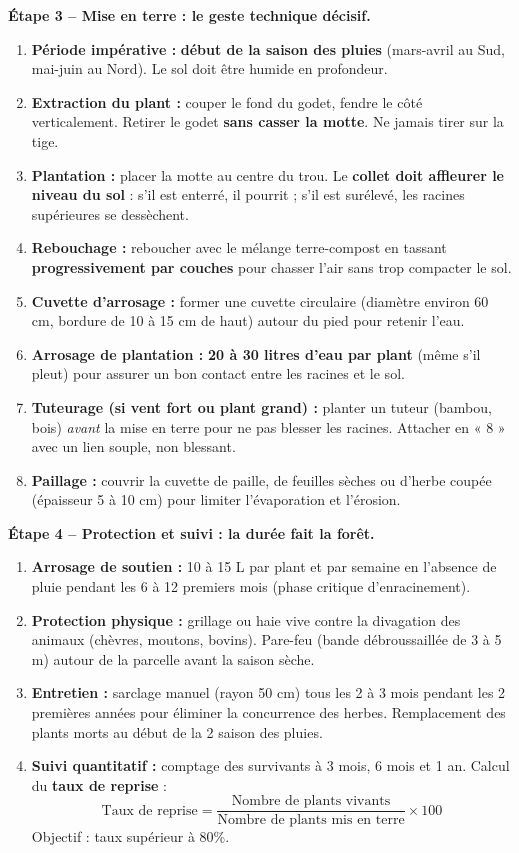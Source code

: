 \documentclass[11pt]{article}
\begin{document}
\begin{methode}
\textbf{Étape 3 -- Mise en terre : le geste technique décisif.}
\begin{enumerate}
    \item \textbf{Période impérative :} \textbf{début de la saison des pluies} (mars-avril au Sud, mai-juin au Nord). Le sol doit être humide en profondeur.
    \item \textbf{Extraction du plant :} couper le fond du godet, fendre le côté verticalement. Retirer le godet \textbf{sans casser la motte}. Ne jamais tirer sur la tige.
    \item \textbf{Plantation :} placer la motte au centre du trou. Le \textbf{collet doit affleurer le niveau du sol} : s'il est enterré, il pourrit ; s'il est surélevé, les racines supérieures se dessèchent.
    \item \textbf{Rebouchage :} reboucher avec le mélange terre-compost en tassant \textbf{progressivement par couches} pour chasser l'air sans trop compacter le sol.
    \item \textbf{Cuvette d'arrosage :} former une cuvette circulaire (diamètre environ 60 cm, bordure de 10 à 15 cm de haut) autour du pied pour retenir l'eau.
    \item \textbf{Arrosage de plantation :} \textbf{20 à 30 litres d'eau par plant} (même s'il pleut) pour assurer un bon contact entre les racines et le sol.
    \item \textbf{Tuteurage (si vent fort ou plant grand) :} planter un tuteur (bambou, bois) \textit{avant} la mise en terre pour ne pas blesser les racines. Attacher en « 8 » avec un lien souple, non blessant.
    \item \textbf{Paillage :} couvrir la cuvette de paille, de feuilles sèches ou d'herbe coupée (épaisseur 5 à 10 cm) pour limiter l'évaporation et l'érosion.
\end{enumerate}

\textbf{Étape 4 -- Protection et suivi : la durée fait la forêt.}
\begin{enumerate}
    \item \textbf{Arrosage de soutien :} 10 à 15 L par plant et par semaine en l'absence de pluie pendant les 6 à 12 premiers mois (phase critique d'enracinement).
    \item \textbf{Protection physique :} grillage ou haie vive contre la divagation des animaux (chèvres, moutons, bovins). Pare-feu (bande débroussaillée de 3 à 5 m) autour de la parcelle avant la saison sèche.
    \item \textbf{Entretien :} sarclage manuel (rayon 50 cm) tous les 2 à 3 mois pendant les 2 premières années pour éliminer la concurrence des herbes. Remplacement des plants morts au début de la 2 saison des pluies.
    \item \textbf{Suivi quantitatif :} comptage des survivants à 3 mois, 6 mois et 1 an. Calcul du \textbf{taux de reprise} :
    \[ \text{Taux de reprise} = \frac{\text{Nombre de plants vivants}}{\text{Nombre de plants mis en terre}} \times 100 \]
    Objectif : taux supérieur à 80\%.
\end{enumerate}
\end{methode}
\end{document}

